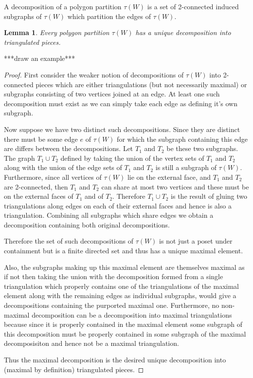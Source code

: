 \documentclass[11pt]{article}
\newtheorem{lem}[thm]{Lemma}
\theoremstyle{remark}
\theoremstyle{definition}
\begin{document}
A decomposition of a polygon partition $\tau(W)$ is a set of 2-connected induced subgraphs of $\tau(W)$ which partition the edges of $\tau(W)$.

\begin{lem}
  Every polygon partition $\tau(W)$ has a unique decomposition into triangulated pieces.
\end{lem}

***draw an example***

\begin{proof}
  First consider the weaker notion of decompositions of $\tau(W)$ into 2-connected pieces which are either triangulations (but not necessarily maximal) or subgraphs consisting of two vertices joined at an edge.  At least one such decomposition must exist as we can simply take each edge as defining it's own subgraph.

  Now suppose we have two distinct such decompositions.  Since they are distinct there must be some edge $e$ of $\tau(W)$ for which the subgraph containing this edge are differs between the decompositions.  Let $T_1$ and $T_2$ be these two subgraphs.  The graph $T_1\cup T_2$ defined by taking the union of the vertex sets of $T_1$ and $T_2$ along with the union of the edge sets of $T_1$ and $T_2$ is still a subgraph of $\tau(W)$.  Furthermore, since all vertices of $\tau(W)$ lie on the external face, and $T_1$ and $T_2$ are 2-connected, then $T_1$ and $T_2$ can share at most two vertices and these must be on the external faces of $T_1$ and of $T_2$.  Therefore $T_1\cup T_2$ is the result of gluing two triangulations along edges on each of their external faces and hence is also a triangulation.  Combining all subgraphs which share edges we obtain a decomposition containing both original decompositions.

  Therefore the set of such decompositions of $\tau(W)$ is not just a poset under containment but is a finite directed set and thus has a unique maximal element.

Also, the subgraphs making up this maximal element are themselves maximal as if not then taking the union with the decomposition formed from a single triangulation which properly contains one of the triangulations of the maximal element along with the remaining edges as individual subgraphs, would give a decompositions containing the purported maximal one.  Furthermore, no non-maximal decomposition can be a decomposition into maximal triangulations because since it is properly contained in the maximal element some subgraph of this decomposition must be properly contained in some subgraph of the maximal decomposisiton and hence not be a maximal triangulation.

  Thus the maximal decomposition is the desired unique decomposition into (maximal by definition) triangulated pieces.
\end{proof}
\end{document}
